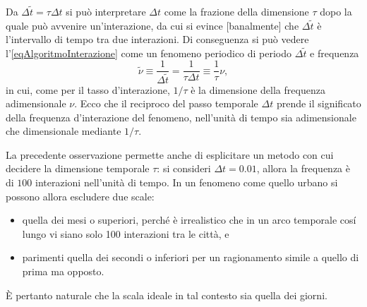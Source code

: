         \begin{oss}
          Da \(\Delta\tilde t=\tau\Delta t\) si può interpretare \(\Delta t\) come la frazione della dimensione \(\tau\) dopo la quale può avvenire un'interazione, da cui si evince [banalmente] che \(\Delta\tilde t\) è l'intervallo di tempo tra due interazioni. Di conseguenza si può vedere l'\ref{eqAlgoritmoInterazione} come un fenomeno periodico di periodo \(\Delta\tilde t\) e frequenza
          \begin{equation*}
            \tilde\nu\equiv\frac1{\Delta\tilde t}=\frac1{\tau\Delta t}\equiv\frac1\tau\nu,
          \end{equation*}
          in cui, come per il tasso d'interazione, \(1/\tau\) è la dimensione della frequenza adimensionale \(\nu\). Ecco che il reciproco del passo temporale \(\Delta t\) prende il significato della frequenza d'interazione del fenomeno, nell'unità di tempo sia adimensionale che dimensionale mediante \(1/\tau\).%
        \end{oss}

        \begin{oss}
          \label{ossSceltaScalaTemporale}
          La precedente osservazione permette anche di esplicitare un metodo con cui decidere la dimensione temporale \(\tau\): si consideri \(\Delta t=0.01\), allora la frequenza è di \(100\) interazioni nell'unità di tempo. In un fenomeno come quello urbano si possono allora escludere due scale:

          \begin{itemize}[
            label=\(\diamond\),
            itemsep=0.1em,
          ]
            \item quella dei mesi o superiori, perché è irrealistico che in un arco temporale cosí lungo vi siano solo 100 interazioni tra le città, e
            \item parimenti quella dei secondi o inferiori per un ragionamento simile a quello di prima ma opposto.
          \end{itemize}

          È pertanto naturale che la scala ideale in tal contesto sia quella dei giorni.
        \end{oss}

